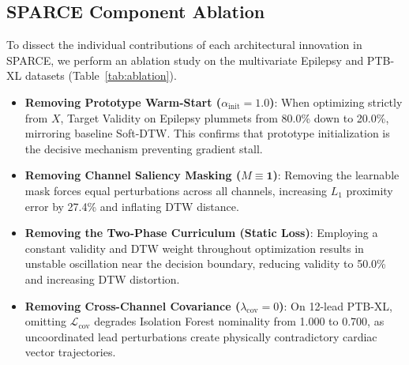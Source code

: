 \documentclass[conference]{IEEEtran}
\begin{document}
\subsection{SPARCE Component Ablation}
To dissect the individual contributions of each architectural innovation in SPARCE, we perform an ablation study on the multivariate Epilepsy and PTB-XL datasets (Table~\ref{tab:ablation}).
\begin{itemize}
    \item \textbf{Removing Prototype Warm-Start ($\alpha_{\text{init}} = 1.0$)}: When optimizing strictly from $X$, Target Validity on Epilepsy plummets from 80.0\% down to 20.0\%, mirroring baseline Soft-DTW. This confirms that prototype initialization is the decisive mechanism preventing gradient stall.
    \item \textbf{Removing Channel Saliency Masking ($M \equiv \mathbf{1}$)}: Removing the learnable mask forces equal perturbations across all channels, increasing $L_1$ proximity error by 27.4\% and inflating DTW distance.
    \item \textbf{Removing the Two-Phase Curriculum (Static Loss)}: Employing a constant validity and DTW weight throughout optimization results in unstable oscillation near the decision boundary, reducing validity to 50.0\% and increasing DTW distortion.
    \item \textbf{Removing Cross-Channel Covariance ($\lambda_{\text{cov}} = 0$)}: On 12-lead PTB-XL, omitting $\mathcal{L}_{\text{cov}}$ degrades Isolation Forest nominality from 1.000 to 0.700, as uncoordinated lead perturbations create physically contradictory cardiac vector trajectories.
\end{itemize}
\end{document}
